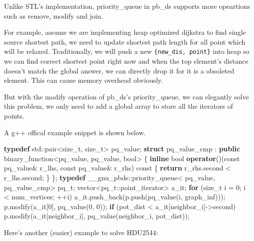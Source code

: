 \documentclass[
]{article}
\newenvironment{Shaded}{}{}
\newcommand{\AttributeTok}[1]{\textcolor[rgb]{0.49,0.56,0.16}{#1}}
\newcommand{\BuiltInTok}[1]{#1}
\newcommand{\ControlFlowTok}[1]{\textcolor[rgb]{0.00,0.44,0.13}{\textbf{#1}}}
\newcommand{\DataTypeTok}[1]{\textcolor[rgb]{0.56,0.13,0.00}{#1}}
\newcommand{\DecValTok}[1]{\textcolor[rgb]{0.25,0.63,0.44}{#1}}
\newcommand{\KeywordTok}[1]{\textcolor[rgb]{0.00,0.44,0.13}{\textbf{#1}}}
\newcommand{\NormalTok}[1]{#1}
\begin{document}
Unlike STL's implementation, priority\_queue in pb\_ds supports more
opeartions such as remove, modify and join.

For example, assume we are implementing heap optimized dijkstra to find
single source shortest path, we need to update shortest path length for
all point which will be relaxed. Traditionally, we will push a new
\texttt{\{new\_dis,\ point\}} into heap so we can find correct shortest
point right now and when the top element's distance doesn't match the
global answer, we can directly drop it for it is a obsoleted element.
This can cause memory overhead obviously.

But with the modify operation of pb\_ds's priority\_queue, we can
elegantly solve this problem, we only need to add a global array to
store all the iterators of points.

A g++ offical example snippet is shown below.

\begin{Shaded}
\begin{Highlighting}[]
\KeywordTok{typedef} \BuiltInTok{std::}\NormalTok{pair<}\DataTypeTok{size_t}\NormalTok{, }\DataTypeTok{size_t}\NormalTok{> pq_value;}
\KeywordTok{struct}\NormalTok{ pq_value_cmp : }\KeywordTok{public}\NormalTok{ binary_function<pq_value, pq_value, }\DataTypeTok{bool}\NormalTok{>}
\NormalTok{\{}
  \KeywordTok{inline} \DataTypeTok{bool}
  \KeywordTok{operator}\NormalTok{()(}\AttributeTok{const}\NormalTok{ pq_value& r_lhs, }\AttributeTok{const}\NormalTok{ pq_value& r_rhs) }\AttributeTok{const}
\NormalTok{  \{ }\ControlFlowTok{return}\NormalTok{ r_rhs.second < r_lhs.second; \}}
\NormalTok{\};}
\KeywordTok{typedef}\NormalTok{ __gnu_pbds::priority_queue< pq_value, pq_value_cmp> }\DataTypeTok{pq_t}\NormalTok{;}
\NormalTok{vector<}\DataTypeTok{pq_t}\NormalTok{::point_iterator> a_it;}
\ControlFlowTok{for}\NormalTok{ (}\DataTypeTok{size_t}\NormalTok{ i = }\DecValTok{0}\NormalTok{; i < num_vertices; ++i)}
\NormalTok{    a_it.push_back(p.push(pq_value(i, graph_inf)));}
\NormalTok{p.modify(a_it[}\DecValTok{0}\NormalTok{], pq_value(}\DecValTok{0}\NormalTok{, }\DecValTok{0}\NormalTok{));}
\ControlFlowTok{if}\NormalTok{ (pot_dist < a_it[neighbor_i]->second)}
\NormalTok{        p.modify(a_it[neighbor_i], pq_value(neighbor_i, pot_dist));}
\end{Highlighting}
\end{Shaded}

Here's another (easier) example to solve HDU2544:
\end{document}
